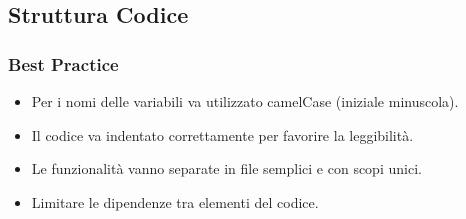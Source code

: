 \subsection{Struttura Codice}
\subsubsection{Best Practice}
\begin{itemize}
    \item Per i nomi delle variabili va utilizzato camelCase (iniziale minuscola).
    \item Il codice va indentato correttamente per favorire la leggibilità.
    \item Le funzionalità vanno separate in file semplici e con scopi unici.
    \item Limitare le dipendenze tra elementi del codice.
\end{itemize}